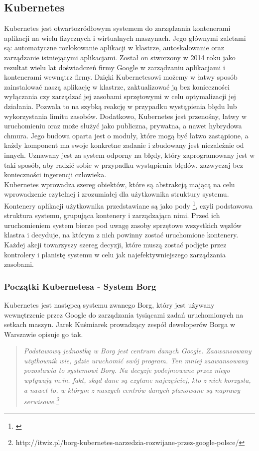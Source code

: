 \documentclass[12pt]{report}
\let\Oldsubsection\subsection
\renewcommand{\subsection}{\FloatBarrier\Oldsubsection}
\let\Oldsubsubsection\subsubsection
\renewcommand{\subsubsection}{\FloatBarrier\Oldsubsubsection}
\begin{document}
\subsection{Kubernetes}
Kubernetes jest otwartozródłowym systemem do zarządzania kontenerami aplikacji na wielu fizycznych i wirtualnych maszynach. Jego głównymi zaletami są: automatyczne rozlokowanie aplikacji w klastrze, autoskalowanie oraz zarządzanie istniejącymi aplikacjami. Został on stworzony w 2014 roku jako rezultat wielu lat doświadczeń firmy Google w zarządzaniu aplikacjami i kontenerami wewnątrz firmy. Dzięki Kubernetesowi możemy w łatwy sposób zainstalować naszą aplikację w klastrze, zaktualizować ją bez konieczności wyłączania czy zarządzać jej zasobami sprzętowymi w celu optymalizacji jej działania. Pozwala to na szybką reakcję w przypadku wystąpienia błędu lub wykorzystania limitu zasobów. Dodatkowo, Kubernetes jest przenośny, łatwy w uruchomieniu oraz może służyć jako publiczna, prywatna, a nawet hybrydowa chmura. Jego budowa oparta jest o moduły, które mogą być łatwo zastąpione, a każdy komponent ma swoje konkretne zadanie i zbudowany jest niezależnie od innych. Uznawany jest za system odporny na błędy, który zaprogramowany jest w taki sposób, aby radzić sobie w przypadku wystąpienia błędów, zazwyczaj bez konieczności ingerencji człowieka. \\
	\indent Kubernetes wprowadza szereg obiektów, które są abstrakcją mającą na celu wprowadzenie czytelnej i zrozumiałej dla użytkownika struktury systemu. Kontenery aplikacji użytkownika przedstawiane są jako pody \footnote{\cite{}}, czyli podstawowa struktura systemu, grupująca kontenery i zarządzająca nimi. Przed ich uruchomieniem system bierze pod uwagę zasoby sprzętowe wszystkich węzłów klastra i decyduje, na którym z nich powinny zostać uruchomione kontenery. Każdej akcji towarzyszy szereg decyzji, które muszą zostać podjęte przez kontrolery i planistę systemu w celu jak najefektywniejszego zarządzania zasobami.
\subsubsection{Początki Kubernetesa - System Borg}
Kubernetes jest następcą systemu zwanego Borg, który jest używany wewnętrzenie przez Google do zarządzania tysiącami zadań uruchomionych na setkach maszyn. Jarek Kuśmiarek prowadzący zespół deweloperów Borga w Warszawie opisuje go tak.

\begin{quote}
\it{Podstawową jednostką w Borg jest centrum danych Google. Zaawansowany użytkownik wie, gdzie uruchomić swój program. Ten mniej zaawansowany pozostawia to systemowi Borg. Na decyzje podejmowane przez niego wpływają m.in. fakt, skąd dane są czytane najczęściej, kto z nich korzysta, a nawet to, w którym z naszych centrów danych planowane są naprawy serwisowe.\footnote{http://itwiz.pl/borg-kubernetes-narzedzia-rozwijane-przez-google-polsce/\cite{}}}
\end{quote}
\end{document}

